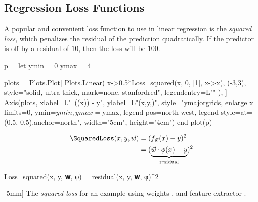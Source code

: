 

\subsection{Regression Loss Functions} %
\label{sec:regression_loss_functions}

A popular and convenient loss function to use in linear regression is the \textit{squared loss},
which penalizes the residual of the prediction quadratically.
If the predictor is off by a residual of $10$, then the loss will be $100$.
\begin{marginfigure}[-5mm]
  \begin{jlcode}
    p = let
        ymin = 0
        ymax = 4

        plots = Plots.Plot[
            Plots.Linear(
                x->0.5*Loss_squared(x, 0, [1], x->x), (-3,3), style="solid, ultra thick, mark=none, stanfordred", legendentry=L"\SquaredLoss"
            ),
        ]
        Axis(plots,
             xlabel=L"~(\cdot\phi(x)) - y",
             ylabel=L"\Loss(x,y,)",
             style="ymajorgrids, enlarge x limits=0, ymin=$ymin, ymax=$ymax, legend pos=north west, legend style={at={(0.5,-0.5)},anchor=north}",
             width="5cm", height="4cm")
    end
    plot(p)
  \end{jlcode}
  \begin{center}
  \end{center}
\end{marginfigure}
\begin{equation*}
\begin{aligned}
    \SquaredLoss(x, y, \vec{w}) &= (f_{\vec{w}}(x) - y)^2\\
                                &= (\underbrace{\vec{w} \cdot \phi(x)-y}_\text{residual})^2
\end{aligned}
\end{equation*}
\begin{algorithm}
\begin{juliaverbatim}
Loss_squared(x, y, 𝐰, φ) = residual(x, y, 𝐰, φ)^2
\end{juliaverbatim}

\caption[][-5mm]{
    \label{alg:squared_loss}
    The \textit{squared loss} for an example  using weights , and feature extractor .
}
\end{algorithm}

